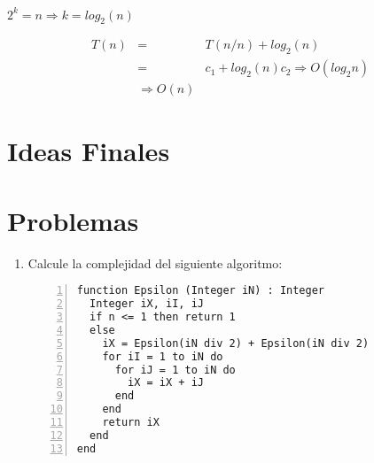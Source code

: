 $2^{k} = n \Rightarrow k = log_2(n)$

\begin{eqnarray*}
T(n)&=&T(n/n) + log_2(n)\\
&=&c_1 + log_2(n)c_2 \Rightarrow O(log_2n) \\
&\Rightarrow O(n)
\end{eqnarray*}
\section{Ideas Finales}

\section{Problemas}
\begin{enumerate}
\item Calcule la complejidad del siguiente algoritmo:
\begin{lstlisting}[upquote=true, language=pseudo, numbers=left]
function Epsilon (Integer iN) : Integer
  Integer iX, iI, iJ
  if n <= 1 then return 1
  else
    iX = Epsilon(iN div 2) + Epsilon(iN div 2)
    for iI = 1 to iN do
      for iJ = 1 to iN do
        iX = iX + iJ
      end
    end
    return iX
  end
end
\end{lstlisting}
\end{enumerate}
